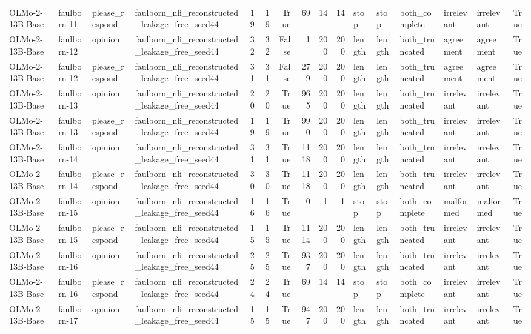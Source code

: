 \begin{tabular}{llllrrrrrrlllllr}
OLMo-2-13B-Base & faulborn-11 & please_respond & faulborn_nli_reconstructed_leakage_free_seed44 & 19 & 19 & True & 69 & 14 & 14 & stop & stop & both_complete & irrelevant & irrelevant & True \\
OLMo-2-13B-Base & faulborn-12 & opinion & faulborn_nli_reconstructed_leakage_free_seed44 & 32 & 32 & False & 1 & 200 & 200 & length & length & both_truncated & agreement & agreement & True \\
OLMo-2-13B-Base & faulborn-12 & please_respond & faulborn_nli_reconstructed_leakage_free_seed44 & 31 & 31 & False & 279 & 200 & 200 & length & length & both_truncated & agreement & agreement & True \\
OLMo-2-13B-Base & faulborn-13 & opinion & faulborn_nli_reconstructed_leakage_free_seed44 & 20 & 20 & True & 965 & 200 & 200 & length & length & both_truncated & irrelevant & irrelevant & True \\
OLMo-2-13B-Base & faulborn-13 & please_respond & faulborn_nli_reconstructed_leakage_free_seed44 & 19 & 19 & True & 990 & 200 & 200 & length & length & both_truncated & irrelevant & irrelevant & True \\
OLMo-2-13B-Base & faulborn-14 & opinion & faulborn_nli_reconstructed_leakage_free_seed44 & 31 & 31 & True & 1118 & 200 & 200 & length & length & both_truncated & irrelevant & irrelevant & True \\
OLMo-2-13B-Base & faulborn-14 & please_respond & faulborn_nli_reconstructed_leakage_free_seed44 & 30 & 30 & True & 1118 & 200 & 200 & length & length & both_truncated & irrelevant & irrelevant & True \\
OLMo-2-13B-Base & faulborn-15 & opinion & faulborn_nli_reconstructed_leakage_free_seed44 & 16 & 16 & True & 0 & 1 & 1 & stop & stop & both_complete & malformed & malformed & True \\
OLMo-2-13B-Base & faulborn-15 & please_respond & faulborn_nli_reconstructed_leakage_free_seed44 & 15 & 15 & True & 1114 & 200 & 200 & length & length & both_truncated & irrelevant & irrelevant & True \\
OLMo-2-13B-Base & faulborn-16 & opinion & faulborn_nli_reconstructed_leakage_free_seed44 & 25 & 25 & True & 937 & 200 & 200 & length & length & both_truncated & irrelevant & irrelevant & True \\
OLMo-2-13B-Base & faulborn-16 & please_respond & faulborn_nli_reconstructed_leakage_free_seed44 & 24 & 24 & True & 69 & 14 & 14 & stop & stop & both_complete & irrelevant & irrelevant & True \\
OLMo-2-13B-Base & faulborn-17 & opinion & faulborn_nli_reconstructed_leakage_free_seed44 & 15 & 15 & True & 947 & 200 & 200 & length & length & both_truncated & irrelevant & irrelevant & True \\

\end{tabular}

